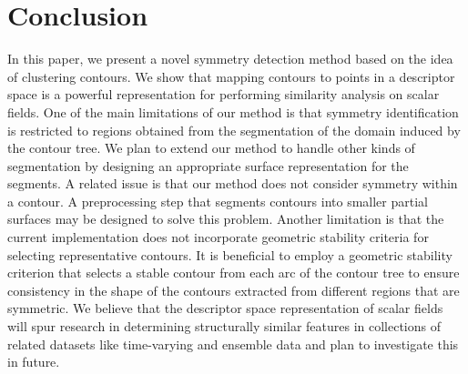 \documentclass[review,journal]{vgtc}         %
\begin{document}
\section{Conclusion}
In this paper, we present a novel symmetry detection method based on the idea of clustering contours.
We show that mapping contours to points in a descriptor space is a powerful representation for
performing similarity analysis on scalar fields. One of the main limitations of our method is that
symmetry identification is restricted to regions obtained from the segmentation of the domain induced
by the contour tree. We plan to extend our method to handle other kinds of segmentation by designing
an appropriate surface representation for the segments. A related issue is that our method does not 
consider symmetry within a contour. A preprocessing step that segments contours into smaller partial
surfaces may be designed to solve this problem. Another limitation is that the current implementation
does not incorporate geometric stability criteria for selecting representative contours. 
It is beneficial to employ a geometric stability criterion that selects a stable contour 
from each arc of the contour tree to ensure consistency
in the shape of the contours extracted from different regions that are symmetric.
We believe
that the descriptor space representation of scalar fields will spur research in determining structurally
similar features in collections of related datasets like time-varying and ensemble data and plan to 
investigate this in future.
%
%
%
%
%
\end{document}
